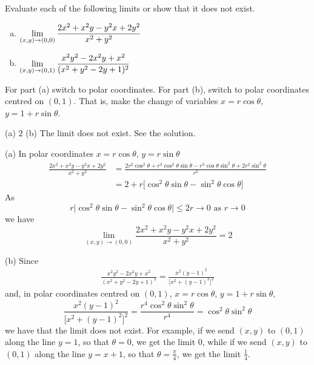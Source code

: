 \subsection*{\Application}

\begin{question}[M226 2010D] %
Evaluate each of the following limits or show that it does not exist.
\begin{enumerate}[(a)]
\item
$\displaystyle\lim_{(x,y)\rightarrow (0,0)}\frac{2x^2 + x^2y - y^2x + 2y^2}{x^2 + y^2}$
\item
$\displaystyle\lim_{(x,y)\rightarrow(0,1)} \frac{x^2y^2 -2 x^2y + x^2}
                                       {(x^2 + y^2-2y+1)^2}$
\end{enumerate}
\end{question}

\begin{hint}
For part (a) switch to polar coordinates.
For part (b), switch to polar coordinates
centred on $(0,1)$. That is, make the change of variables
$x=r\cos\theta$, $y=1+r\sin\theta$. 
\end{hint}

\begin{answer}
(a) $2$\qquad
(b) The limit does not exist. See the solution.
\end{answer}

\begin{solution}
(a) In polar coordinates $x=r\cos\theta$, $y=r\sin\theta$
\begin{align*}
\frac{2x^2 + x^2y - y^2x + 2y^2}{x^2 + y^2} 
&=\frac{2r^2\cos^2\theta + r^3\cos^2\theta\sin\theta - r^3\cos\theta\sin^2\theta 
                 + 2r^2\sin^2\theta}{r^2} \\ 
&=2+ r\big[\cos^2\theta\sin\theta - \sin^2\theta\cos\theta \big]
\end{align*}
As
\begin{equation*}
r\big|\cos^2\theta\sin\theta - \sin^2\theta\cos\theta \big|
\le 2r
\rightarrow 0\text{ as }r\rightarrow 0
\end{equation*}
we have
\begin{equation*}
\lim_{(x,y)\rightarrow(0,0)} \frac{2x^2 + x^2y - y^2x + 2y^2}{x^2 + y^2}=2
\end{equation*}

(b)
Since 
\begin{align*}
\frac{x^2y^2 -2 x^2y + x^2} {(x^2 + y^2-2y+1)^2} 
=\frac{x^2(y-1)^2} {\big[x^2 + (y-1)^2\big]^2} 
\end{align*}
and, in polar coordinates centred on $(0,1)$,
$x=r\cos\theta$, $y=1+r\sin\theta$,
\begin{equation*}
\frac{x^2(y-1)^2} {\big[x^2 + (y-1)^2\big]^2} 
=\frac{r^4\cos^2\theta\sin^2\theta}{r^4}
=\cos^2\theta\sin^2\theta
\end{equation*}
we have that the limit does not exist. For example, if we send $(x,y)$
to $(0,1)$ along the line $y=1$, so that $\theta=0$, we get the limit $0$,
while if we send $(x,y)$ to $(0,1)$ along the line $y=x+1$, so that 
$\theta=\frac{\pi}{4}$, we get the limit $\frac{1}{4}$.
\end{solution}

